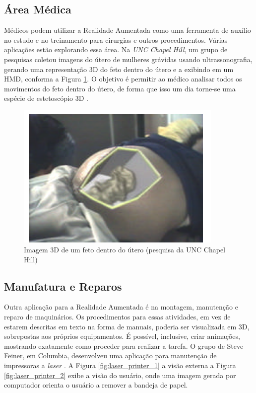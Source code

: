 \subsection{Área Médica}

Médicos podem utilizar a Realidade Aumentada como uma ferramenta de auxílio
no estudo e no treinamento para cirurgias e outros procedimentos. Várias 
aplicações estão explorando essa área. Na \textit{UNC Chapel Hill}, um grupo
de pesquisas coletou imagens do útero de mulheres grávidas usando ultrassonografia,
gerando uma representação 3D do feto dentro do útero e a exibindo em um \gls{HMD}, 
conforma a Figura \ref{fig:feto_utero_3d}. O objetivo é permitir ao médico analisar todos os movimentos
do feto dentro do útero, de forma que isso um dia torne-se uma espécie de estetoscópio 3D \cite{Feto3D}.

\begin{figure}[h!]
    \centering
    \caption{Imagem 3D de um feto dentro do útero (pesquisa da UNC Chapel Hill)}
    \label{fig:feto_utero_3d}
    \includegraphics[width=10cm]{resources/feto-3d.png}
\end{figure}



\subsection{Manufatura e Reparos}

Outra aplicação para a Realidade Aumentada é na montagem, manutenção e reparo
de maquinários. Os procedimentos para essas atividades, em vez de estarem descritas
em texto na forma de manuais, poderia ser visualizada em 3D, sobrepostas aos
próprios equipamentos. É possível, inclusive, criar animações, mostrando exatamente
como proceder para realizar a tarefa. O grupo de Steve Feiner, em Columbia, desenvolveu
uma aplicação para manutenção de impressoras a \textit{laser} \cite{LaserPrinterAR}. 
A Figura \ref{fig:laser_printer_1} a visão externa a Figura \ref{fig:laser_printer_2} 
exibe a visão do usuário, onde uma 
imagem gerada por computador orienta o usuário a remover a bandeja de papel.


